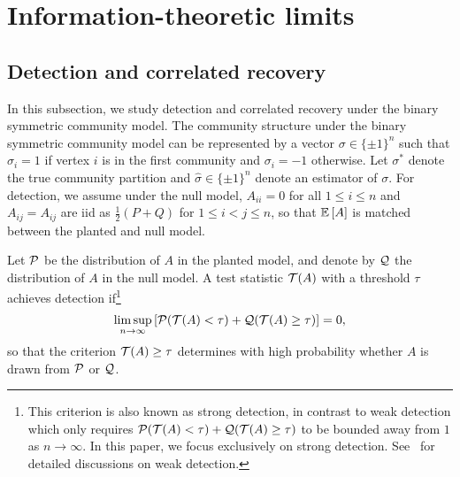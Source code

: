 

 \section{Information-theoretic limits}
 

\subsection{Detection and correlated recovery}
	\label{sec:detection}
In this subsection, we study  detection and correlated recovery under the binary symmetric community model.
The community structure under the binary symmetric community model can be represented by a vector $\sigma \in \{\pm 1\}^n$
such that $\sigma_i=1$ if vertex $i$ is in the first community and $\sigma_i=-1$ otherwise. 
Let $\sigma^*$ denote the true community partition and 
$\hat{\sigma} \in \{\pm 1\}^n$ denote an estimator of $\sigma$. 
For detection, we assume under the null model, $A_{ii}=0$ for all $1 \le i \le n$ and $A_{ij}=A_{ij}$ are iid as $\frac{1}{2}(P+Q)$ for $1 \le i < j \le n$, so that $\expect{A}$ is matched between the planted and null model. 


\begin{definition}[Detection]
Let $\P$ be the distribution of $A$ in the planted model, 
and denote by $\Q$ the distribution of $A$ in the null model.  A test statistic $\calT(A)$ with a threshold $\tau$ achieves detection if\footnote{This criterion is also known as strong detection, 
in contrast to weak detection which
only requires 
$\P( \calT(A) < \tau ) + \Q( \calT(A) \ge \tau )$ to be bounded away from $1$
as $n \to \infty$. In this paper, we focus exclusively on strong detection. 
See~\cite{PerryWeinBandeira16,alaoui2017finite} for detailed discussions on weak detection.
}
\[
\limsup_{n \to \infty} \left[ \P( \calT(A) < \tau) + \Q(\calT(A) \ge \tau) \right] = 0,
\]
 so that the criterion $\calT(A) \ge \tau$ determines with high probability whether $A$ is drawn from $\P$ or $\Q$.
\end{definition}


